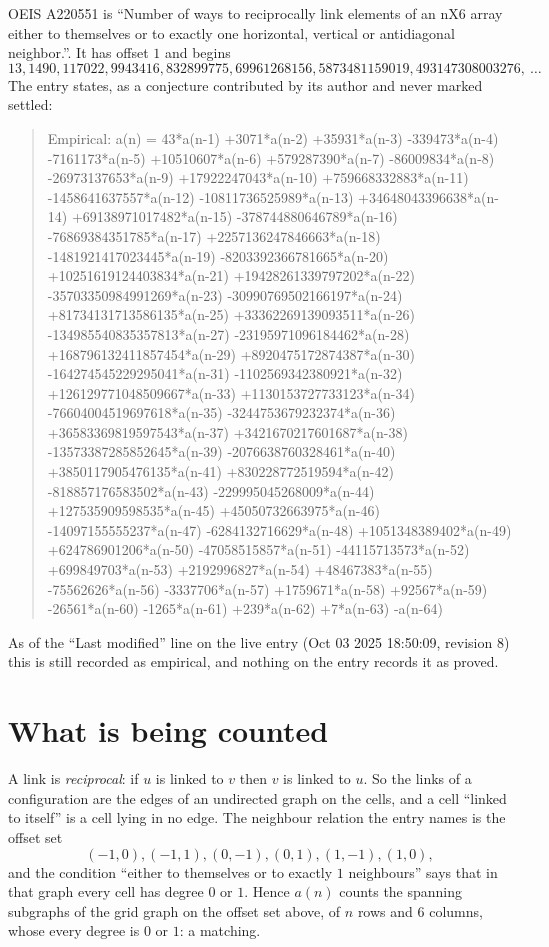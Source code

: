 \documentclass[11pt,a4paper]{article}
\theoremstyle{plain}
\theoremstyle{definition}
\begin{document}
OEIS A220551 is ``Number of ways to reciprocally link elements of an nX6 array either to themselves or to exactly one horizontal, vertical or antidiagonal neighbor.''. It has offset $1$ and begins
\[
13, 1490, 117022, 9943416, 832899775, 69961268156, 5873481159019, 493147308003276,\ \dots
\]
The entry states, as a conjecture contributed by its author and never marked settled:
\begin{quote}
Empirical: a(n) = 43*a(n-1) +3071*a(n-2) +35931*a(n-3) -339473*a(n-4) -7161173*a(n-5) +10510607*a(n-6) +579287390*a(n-7) -86009834*a(n-8) -26973137653*a(n-9) +17922247043*a(n-10) +759668332883*a(n-11) -1458641637557*a(n-12) -10811736525989*a(n-13) +34648043396638*a(n-14) +69138971017482*a(n-15) -378744880646789*a(n-16) -76869384351785*a(n-17) +2257136247846663*a(n-18) -1481921417023445*a(n-19) -8203392366781665*a(n-20) +10251619124403834*a(n-21) +19428261339797202*a(n-22) -35703350984991269*a(n-23) -30990769502166197*a(n-24) +81734131713586135*a(n-25) +33362269139093511*a(n-26) -134985540835357813*a(n-27) -23195971096184462*a(n-28) +168796132411857454*a(n-29) +8920475172874387*a(n-30) -164274545229295041*a(n-31) -1102569342380921*a(n-32) +126129771048509667*a(n-33) +1130153727733123*a(n-34) -76604004519697618*a(n-35) -3244753679232374*a(n-36) +36583369819597543*a(n-37) +3421670217601687*a(n-38) -13573387285852645*a(n-39) -2076638760328461*a(n-40) +3850117905476135*a(n-41) +830228772519594*a(n-42) -818857176583502*a(n-43) -229995045268009*a(n-44) +127535909598535*a(n-45) +45050732663975*a(n-46) -14097155555237*a(n-47) -6284132716629*a(n-48) +1051348389402*a(n-49) +624786901206*a(n-50) -47058515857*a(n-51) -44115713573*a(n-52) +699849703*a(n-53) +2192996827*a(n-54) +48467383*a(n-55) -75562626*a(n-56) -3337706*a(n-57) +1759671*a(n-58) +92567*a(n-59) -26561*a(n-60) -1265*a(n-61) +239*a(n-62) +7*a(n-63) -a(n-64)
\end{quote}
As of the ``Last modified'' line on the live entry (Oct 03 2025 18:50:09, revision 8) this is still
recorded as empirical, and nothing on the entry records it as proved.

\section{What is being counted}

A link is \emph{reciprocal}: if $u$ is linked to $v$ then $v$ is linked to $u$. So the links
of a configuration are the edges of an undirected graph on the cells, and a cell ``linked to
itself'' is a cell lying in no edge. The neighbour relation the entry names is the offset set
\[
(-1,0), (-1,1), (0,-1), (0,1), (1,-1), (1,0),
\]
and the condition ``either to themselves or to exactly $1$ neighbours'' says that in that
graph every cell has degree $0$ or $1$. Hence $a(n)$ counts the spanning subgraphs of the
grid graph on the offset set above, of $n$ rows and $6$ columns,
whose every degree is $0$ or $1$: a matching.
\end{document}
